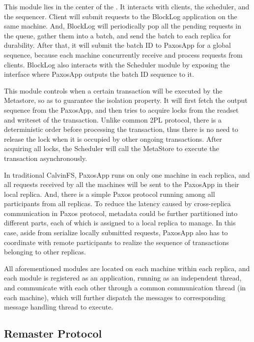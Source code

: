 
\noindent This module lies in the center of the \name{}. It interacts with clients, the scheduler, and the sequencer. Client will submit requests to the BlockLog application on the same machine. And, BlockLog will periodically pop all the pending requests in the queue, gather them into a batch, and send the batch to each replica for durability. After that, it will submit the batch ID to PaxosApp for a global sequence, because each machine concurrently receive and process requests from clients. BlockLog also interacts with the Scheduler module by exposing the interface where PaxosApp outputs the batch ID sequence to it.


\noindent This module controls when a certain transaction will be executed by the Metastore, so as to guarantee the isolation property. It will first fetch the output sequence from the PaxosApp, and then tries to acquire locks from the readset and writeset of the transaction. Unlike common 2PL protocol, there is a deterministic order before processing the transaction, thus there is no need to release the lock when it is occupied by other ongoing transactions. After acquiring all locks, the Scheduler will call the MetaStore to execute the transaction asynchronously.


\noindent In traditional CalvinFS, PaxosApp runs on only one machine in each replica, and all requests received by all the machines will be sent to the PaxosApp in their local replica. And, there is a simple Paxos protocol running among all participants from all replicas. To reduce the latency caused by cross-replica communication in Paxos protocol, metadata could be further partitioned into different parts, each of which is assigned to a local replica to manage. In this case, aside from serialize locally submitted requests, PaxosApp also has to coordinate with remote participants to realize the sequence of transactions belonging to other replicas. 




All aforementioned modules are located on each machine within each replica, and each module is registered as an application, running as an independent thread, and communicate with each other through a common communication thread (in each machine), which will further dispatch the messages to corresponding message handling thread to execute.

\subsection{Remaster Protocol}

